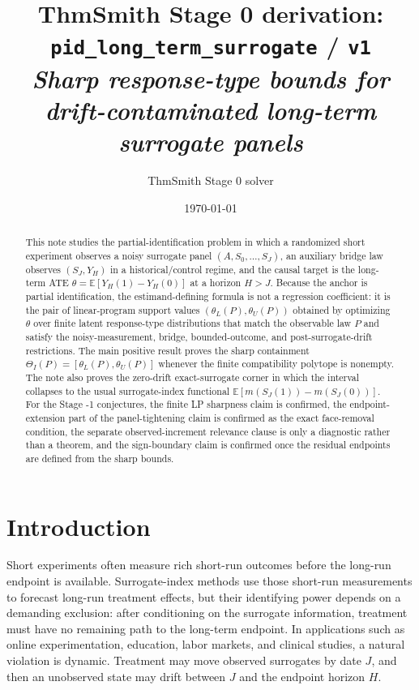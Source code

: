 \documentclass[11pt]{article}
\title{ThmSmith Stage 0 derivation: \texttt{pid\_long\_term\_surrogate} / \texttt{v1}%
  \\ \large\textit{Sharp response-type bounds for drift-contaminated long-term surrogate panels}}
\author{ThmSmith Stage 0 solver}
\date{\today}
\newcommand{\E}{\mathbb{E}}
\theoremstyle{definition}
\theoremstyle{plain}
\theoremstyle{remark}
\begin{document}
\maketitle


\begin{abstract}
This note studies the partial-identification problem in which a randomized short experiment observes a noisy surrogate panel \((A,S_0,\ldots,S_J)\), an auxiliary bridge law observes \((S_J,Y_H)\) in a historical/control regime, and the causal target is the long-term ATE \(\theta=\E[Y_H(1)-Y_H(0)]\) at a horizon \(H>J\).  Because the anchor is partial identification, the estimand-defining formula is not a regression coefficient: it is the pair of linear-program support values \((\theta_L(P),\theta_U(P))\) obtained by optimizing \(\theta\) over finite latent response-type distributions that match the observable law \(P\) and satisfy the noisy-measurement, bridge, bounded-outcome, and post-surrogate-drift restrictions.  The main positive result proves the sharp containment \(\Theta_I(P)=[\theta_L(P),\theta_U(P)]\) whenever the finite compatibility polytope is nonempty.  The note also proves the zero-drift exact-surrogate corner in which the interval collapses to the usual surrogate-index functional \(\E[m(S_J(1))-m(S_J(0))]\).  For the Stage -1 conjectures, the finite LP sharpness claim is confirmed, the endpoint-extension part of the panel-tightening claim is confirmed as the exact face-removal condition, the separate observed-increment relevance clause is only a diagnostic rather than a theorem, and the sign-boundary claim is confirmed once the residual endpoints are defined from the sharp bounds.
\end{abstract}

\section{Introduction}
Short experiments often measure rich short-run outcomes before the long-run endpoint is available.  Surrogate-index methods use those short-run measurements to forecast long-run treatment effects, but their identifying power depends on a demanding exclusion: after conditioning on the surrogate information, treatment must have no remaining path to the long-term endpoint.  In applications such as online experimentation, education, labor markets, and clinical studies, a natural violation is dynamic.  Treatment may move observed surrogates by date \(J\), and then an unobserved state may drift between \(J\) and the endpoint horizon \(H\).
\end{document}
